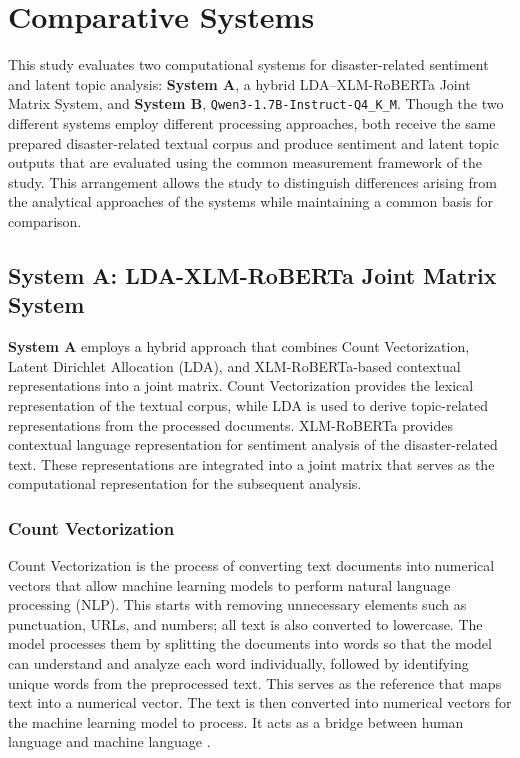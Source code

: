 \documentclass[12pt,a4paper]{report}
\newcommand{\sysA}{\textbf{System A}}
\newcommand{\sysB}{\textbf{System B}}
\newcommand{\qwen}{\texttt{Qwen3-1.7B-Instruct-Q4\_K\_M}}
\newcommand{\xlmr}{XLM-RoBERTa}
\begin{document}
\section{Comparative Systems}

This study evaluates two computational systems for disaster-related sentiment
and latent topic analysis: \sysA, a hybrid LDA--\xlmr{} Joint Matrix System, and
\sysB, \qwen. Though the two different systems employ different processing
approaches, both receive the same prepared disaster-related textual corpus and
produce sentiment and latent topic outputs that are evaluated using the common
measurement framework of the study. This arrangement allows the study to
distinguish differences arising from the analytical approaches of the systems
while maintaining a common basis for comparison.

\subsection{System A: LDA-XLM-RoBERTa Joint Matrix System}

\sysA{} employs a hybrid approach that combines Count Vectorization, Latent
Dirichlet Allocation (LDA), and \xlmr-based contextual representations into a
joint matrix. Count Vectorization provides the lexical representation of the
textual corpus, while LDA is used to derive topic-related representations from
the processed documents. \xlmr{} provides contextual language representation
for sentiment analysis of the disaster-related text. These representations are
integrated into a joint matrix that serves as the computational representation
for the subsequent analysis.

\subsubsection{Count Vectorization}

Count Vectorization is the process of converting text documents into numerical
vectors that allow machine learning models to perform natural language
processing (NLP). This starts with removing unnecessary elements such as
punctuation, URLs, and numbers; all text is also converted to lowercase. The
model processes them by splitting the documents into words so that the model
can understand and analyze each word individually, followed by identifying
unique words from the preprocessed text. This serves as the reference that maps
text into a numerical vector. The text is then converted into numerical vectors
for the machine learning model to process. It acts as a bridge between human
language and machine language \parencite{kozhevnikov2020}.
\end{document}
